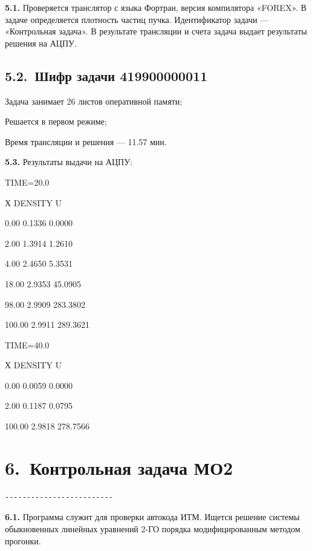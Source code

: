\documentclass[11pt,a4paper]{article}
\begin{document}
\par\textbf{5.1.} Проверяется транслятор с языка Фортран, версия компилятора «FOREX». В задаче определяется плотность частиц пучка. Идентификатор задачи --- «Контрольная задача». В результате трансляции и счета задача выдает результаты решения на АЦПУ.\par
\subsection*{5.2.~Шифр задачи 419900000011}
Задача занимает 26 листов оперативной памяти;

Решается в первом режиме;

Время трансляции и решения --- 11.57 мин.

\par\textbf{5.3.} Результаты выдачи на АЦПУ:\par
\begin{center}TIME=20.0\end{center}
Х DENSITY U

0.00 0.1336 0.0000

2.00 1.3914 1.2610

4.00 2.4650 5.3531

18.00 2.9353 45.0905

98.00 2.9909 283.3802

100.00 2.9911 289.3621

\begin{center}TIME=40.0\end{center}
Х DENSITY U

0.00 0.0059 0.0000

2.00 0.1187 0.0795

100.00 2.9818 278.7566

\section*{6.~Контрольная задача МО2}
\begin{center}\small
\begin{BVerbatim}
-------------------------
\end{BVerbatim}
\end{center}

\par\textbf{6.1.} Программа служит для проверки автокода ИТМ. Ищется решение системы обыкновенных линейных уравнений 2-ГО порядка модифицированным методом прогонки.\par
\end{document}
